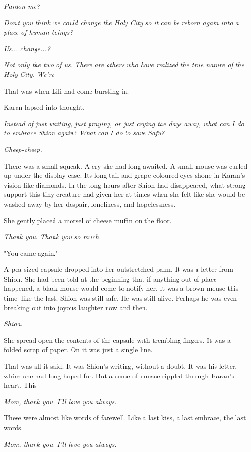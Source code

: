 \emph{Pardon me?}

\emph{Don't you think we could change the Holy City so it can be reborn
again into a place of human beings?}

\emph{Us... change...?}

\emph{Not only the two of us. There are others who have realized the
true nature of the Holy City. We're---}

That was when Lili had come bursting in.

Karan lapsed into thought.

\emph{Instead of just waiting, just praying, or just crying the days
away, what can I do to embrace Shion again? What can I do to save Safu?}

\emph{Cheep-cheep.}

There was a small squeak. A cry she had long awaited. A small mouse was
curled up under the display case. Its long tail and grape-coloured eyes
shone in Karan's vision like diamonds. In the long hours after Shion had
disappeared, what strong support this tiny creature had given her at
times when she felt like she would be washed away by her despair,
loneliness, and hopelessness.

She gently placed a morsel of cheese muffin on the floor.

\emph{Thank you. Thank you so much.}

"You came again."

A pea-sized capsule dropped into her outstretched palm. It was a letter
from Shion. She had been told at the beginning that if anything
out-of-place happened, a black mouse would come to notify her. It was a
brown mouse this time, like the last. Shion was still safe. He was still
alive. Perhaps he was even breaking out into joyous laughter now and
then.

\emph{Shion.}

She spread open the contents of the capsule with trembling fingers. It
was a folded scrap of paper. On it was just a single line.


That was all it said. It was Shion's writing, without a doubt. It was
his letter, which she had long hoped for. But a sense of unease rippled
through Karan's heart. This---

\emph{Mom, thank you. I'll love you always.}

These were almost like words of farewell. Like a last kiss, a last
embrace, the last words.

\emph{Mom, thank you. I'll love you always.}

